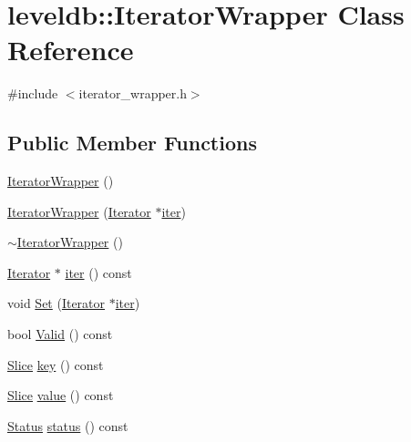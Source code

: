 \hypertarget{classleveldb_1_1_iterator_wrapper}{}\section{leveldb\+:\+:Iterator\+Wrapper Class Reference}
\label{classleveldb_1_1_iterator_wrapper}


{\ttfamily \#include $<$iterator\+\_\+wrapper.\+h$>$}

\subsection*{Public Member Functions}
\begin{DoxyCompactItemize}
\item 
\hyperlink{classleveldb_1_1_iterator_wrapper_a8fba8a05ace9ed7a4f0a32f2c8eab73d}{Iterator\+Wrapper} ()
\item 
\hyperlink{classleveldb_1_1_iterator_wrapper_ab4714f21809e357b4d5b6bdbec4fe98f}{Iterator\+Wrapper} (\hyperlink{classleveldb_1_1_iterator}{Iterator} $\ast$\hyperlink{classleveldb_1_1_iterator_wrapper_a692d580f1e3deb50cd3dc52e68c6d83e}{iter})
\item 
\hyperlink{classleveldb_1_1_iterator_wrapper_acbee07d5d34bbd2e2b5590d77a4e105c}{$\sim$\+Iterator\+Wrapper} ()
\item 
\hyperlink{classleveldb_1_1_iterator}{Iterator} $\ast$ \hyperlink{classleveldb_1_1_iterator_wrapper_a692d580f1e3deb50cd3dc52e68c6d83e}{iter} () const 
\item 
void \hyperlink{classleveldb_1_1_iterator_wrapper_ae14dd8ac682dd596ba2a3d2407e1a4fd}{Set} (\hyperlink{classleveldb_1_1_iterator}{Iterator} $\ast$\hyperlink{classleveldb_1_1_iterator_wrapper_a692d580f1e3deb50cd3dc52e68c6d83e}{iter})
\item 
bool \hyperlink{classleveldb_1_1_iterator_wrapper_a42a21e1d067c50de69f1385ea65e0fc1}{Valid} () const 
\item 
\hyperlink{classleveldb_1_1_slice}{Slice} \hyperlink{classleveldb_1_1_iterator_wrapper_a1c37e4c009e2d3b58f2085022c966470}{key} () const 
\item 
\hyperlink{classleveldb_1_1_slice}{Slice} \hyperlink{classleveldb_1_1_iterator_wrapper_ae9a12c8e016afc20b493de0bfcdaac21}{value} () const 
\item 
\hyperlink{classleveldb_1_1_status}{Status} \hyperlink{classleveldb_1_1_iterator_wrapper_a1aaa880e200db3226cbf1e7373ffb6a8}{status} () const 
\item 

\end{DoxyCompactItemize}
